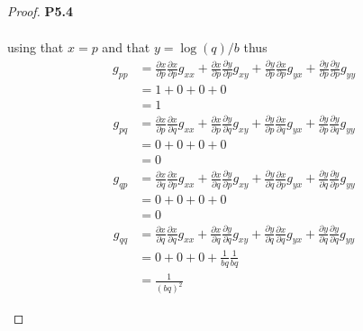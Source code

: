 \documentclass[11pt]{article}
\theoremstyle{definition}
\begin{document}
\begin{proof}{\textbf{P5.4}}
\begin{itemize}
\begin{align*}
        \end{align*}
        using that $x = p$ and that $y = \log(q)/b$ thus
        \begin{align*}
            g_{pp} &= \frac{\partial x}{\partial p}
            \frac{\partial x}{\partial p} g_{xx} + \frac{\partial x}{\partial p}
            \frac{\partial y}{\partial p} g_{xy} + \frac{\partial y}{\partial p}
            \frac{\partial x}{\partial p} g_{yx} + \frac{\partial y}{\partial p}
            \frac{\partial y}{\partial p} g_{yy}\\
            &= 1 + 0 + 0 + 0\\
            &= 1
        \end{align*}
        \begin{align*}
            g_{p q} &= \frac{\partial x}{\partial p}
            \frac{\partial x}{\partial q} g_{xx} +
            \frac{\partial x}{\partial p}
            \frac{\partial y}{\partial q} g_{xy} +
            \frac{\partial y}{\partial p}
            \frac{\partial x}{\partial q} g_{yx} +
            \frac{\partial y}{\partial p}
            \frac{\partial y}{\partial q} g_{yy}\\
            &= 0 + 0 + 0 + 0\\
            &= 0
        \end{align*}
        \begin{align*}
            g_{qp} &= \frac{\partial x}{\partial q}
            \frac{\partial x}{\partial p} g_{xx} +
            \frac{\partial x}{\partial q}
            \frac{\partial y}{\partial p} g_{xy} +
            \frac{\partial y}{\partial q}
            \frac{\partial x}{\partial p} g_{yx} +
            \frac{\partial y}{\partial q}
            \frac{\partial y}{\partial p} g_{yy}\\
            &= 0 + 0 + 0 + 0\\
            &= 0
        \end{align*}
        \begin{align*}
            g_{qq} &= \frac{\partial x}{\partial q}
            \frac{\partial x}{\partial q} g_{xx} +
            \frac{\partial x}{\partial q}
            \frac{\partial y}{\partial q} g_{xy} +
            \frac{\partial y}{\partial q}
            \frac{\partial x}{\partial q} g_{yx} +
            \frac{\partial y}{\partial q}
            \frac{\partial y}{\partial q} g_{yy}\\
            &= 0 + 0 + 0 + \frac{1}{bq} \frac{1}{bq}\\
            &= \frac{1}{(bq)^2}
        \end{align*}

\end{itemize}
\end{proof}
\end{document}
